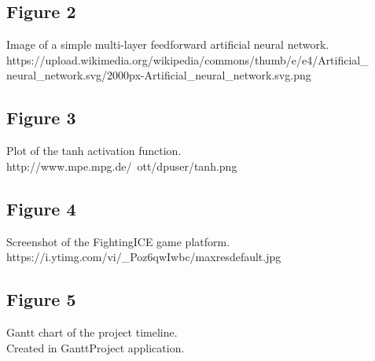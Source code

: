 \documentclass[11pt,a4paper]{article}
\begin{document}
\subsection*{Figure 2}
Image of a simple multi-layer feedforward artificial neural network.\\
 https://upload.wikimedia.org/wikipedia/commons/thumb/e/e4/Artificial\_ neural\_network.svg/2000px-Artificial\_neural\_network.svg.png
\subsection*{Figure 3}
Plot of the tanh activation function.\\
http://www.mpe.mpg.de/~ott/dpuser/tanh.png
\subsection*{Figure 4}
Screenshot of the FightingICE game platform.\\
https://i.ytimg.com/vi/\_Poz6qwIwbc/maxresdefault.jpg
\subsection*{Figure 5}
Gantt chart of the project timeline.\\
Created in GanttProject application.
\newpage
\end{document}
